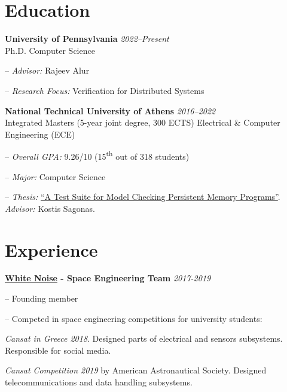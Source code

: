 \documentclass[margin]{res}
\newcommand{\field}[2]{\noindent \textbf{#1} \hfill #2 \\}
\begin{document}
\begin{resume}

\section{Education}

\field{University of Pennsylvania}  {\emph{2022--Present}} 
Ph.D. Computer Science
\begin{compactitem}
\item[--] \emph{Advisor:} Rajeev Alur
\item[--] \emph{Research Focus:} Verification for Distributed Systems
\end{compactitem}
 
\field{National Technical University of Athens}  {\emph{2016--2022}} 
Integrated Masters (5-year joint degree, 300 ECTS) Electrical \& Computer Engineering (ECE)
\begin{compactitem}
\item[--] \emph{Overall GPA:} 9.26/10 (15\textsuperscript{th} out of 318 students)
\item[--] \emph{Major:} Computer Science 
\item[--] \emph{Thesis:} \href{http://artemis.cslab.ece.ntua.gr:8080/jspui/bitstream/123456789/18415/1/thesis.pdf}{``A Test Suite for Model Checking Persistent Memory Programs''}. \\
\emph{Advisor:} Kostis Sagonas.
\end{compactitem} 

\section{Experience}

\textbf{\href{https://whitenoise.gr/}{White Noise} - Space Engineering Team} \hfill \emph{2017-2019}
\begin{compactitem}
\item[--] Founding member
\item[--] Competed in space engineering competitions for university students:
\begin{compactitem}
\item \textit{Cansat in Greece 2018}. 
  Designed parts of electrical and sensors subsystems. 
  Responsible for social media.
\item \textit{Cansat Competition 2019} by American Astronautical Society. 
  Designed telecommunications and data handling subsystems.
\end{compactitem}
\end{compactitem}


\end{resume}
\end{document}

